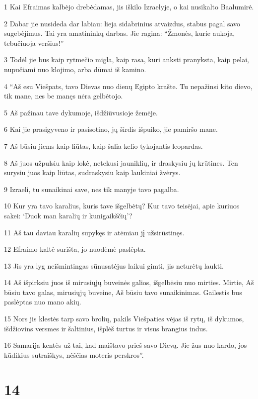 \par 1 Kai Efraimas kalbėjo drebėdamas, jis iškilo Izraelyje, o kai nusikalto Baalu­mirė. 
\par 2 Dabar jie nusideda dar labiau: lieja sidabrinius atvaizdus, stabus pagal savo sugebėjimus. Tai yra amatininkų darbas. Jie ragina: “Žmonės, kurie aukoja, tebučiuoja veršius!” 
\par 3 Todėl jie bus kaip rytmečio migla, kaip rasa, kuri anksti pranyksta, kaip pelai, nupučiami nuo klojimo, arba dūmai iš kamino. 
\par 4 “Aš esu Viešpats, tavo Dievas nuo dienų Egipto krašte. Tu nepažinsi kito dievo, tik mane, nes be manęs nėra gelbėtojo. 
\par 5 Aš pažinau tave dykumoje, išdžiūvusioje žemėje. 
\par 6 Kai jie prasigyveno ir pasisotino, jų širdis išpuiko, jie pamiršo mane. 
\par 7 Aš būsiu jiems kaip liūtas, kaip šalia kelio tykojantis leopardas. 
\par 8 Aš juos užpulsiu kaip lokė, netekusi jauniklių, ir draskysiu jų krūtines. Ten surysiu juos kaip liūtas, sudraskysiu kaip laukiniai žvėrys. 
\par 9 Izraeli, tu sunaikinai save, nes tik manyje tavo pagalba. 
\par 10 Kur yra tavo karalius, kuris tave išgelbėtų? Kur tavo teisėjai, apie kuriuos sakei: ‘Duok man karalių ir kunigaikščių’? 
\par 11 Aš tau daviau karalių supykęs ir atėmiau jį užsirūstinęs. 
\par 12 Efraimo kaltė surišta, jo nuodėmė paslėpta. 
\par 13 Jis yra lyg neišmintingas sūnus­atėjus laikui gimti, jis neturėtų laukti. 
\par 14 Aš išpirksiu juos iš mirusiųjų buveinės galios, išgelbėsiu nuo mirties. Mirtie, Aš būsiu tavo galas, mirusiųjų buveine, Aš būsiu tavo sunaikinimas. Gailestis bus paslėptas nuo mano akių. 
\par 15 Nors jis klestės tarp savo brolių, pakils Viešpaties vėjas iš rytų, iš dykumos, išdžiovins versmes ir šaltinius, išplėš turtus ir visus brangius indus. 
\par 16 Samarija kentės už tai, kad maištavo prieš savo Dievą. Jie žus nuo kardo, jos kūdikius sutraiškys, nėščias moteris perskros”.



\chapter{14}


